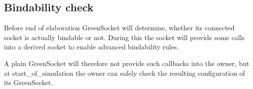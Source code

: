 \documentclass[a4paper,10pt]{article}          %
\begin{document}





\vspace{4mm}
\subsection{Bindability check}
\vspace{4mm}

Before end of elaboration GreenSocket will determine, whether its connected socket is actually bindable or not. During this the socket will provide some calls into a derived socket to enable advanced bindability rules.

A plain GreenSocket will therefore not provide such callbacks into the owner, but at start\_of\_simulation the owner can safely check the resulting configuration of its GreenSocket.



\end{document}
